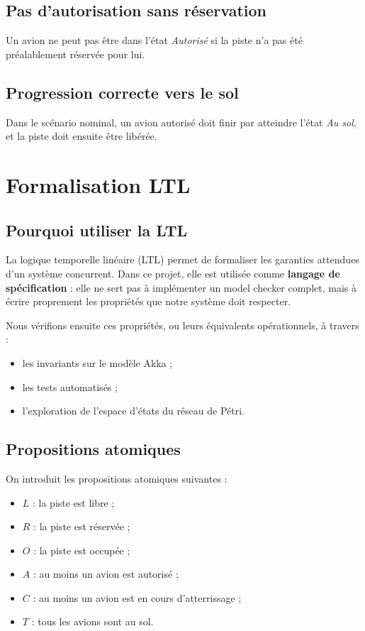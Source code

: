 \documentclass[11pt,a4paper]{article}
\begin{document}
\subsection{Pas d'autorisation sans réservation}

Un avion ne peut pas être dans l'état \emph{Autorisé} si la piste n'a pas été préalablement réservée pour lui.

\subsection{Progression correcte vers le sol}

Dans le scénario nominal, un avion autorisé doit finir par atteindre l'état \emph{Au sol}, et la piste doit ensuite être libérée.

\section{Formalisation LTL}

\subsection{Pourquoi utiliser la LTL}

La logique temporelle linéaire (LTL) permet de formaliser les garanties attendues d'un système concurrent. Dans ce projet, elle est utilisée comme \textbf{langage de spécification} : elle ne sert pas à implémenter un model checker complet, mais à écrire proprement les propriétés que notre système doit respecter.

Nous vérifions ensuite ces propriétés, ou leurs équivalents opérationnels, à travers :
\begin{itemize}
    \item les invariants sur le modèle Akka ;
    \item les tests automatisés ;
    \item l'exploration de l'espace d'états du réseau de Pétri.
\end{itemize}

\subsection{Propositions atomiques}

On introduit les propositions atomiques suivantes :
\begin{itemize}
    \item $L$ : la piste est libre ;
    \item $R$ : la piste est réservée ;
    \item $O$ : la piste est occupée ;
    \item $A$ : au moins un avion est autorisé ;
    \item $C$ : au moins un avion est en cours d'atterrissage ;
    \item $T$ : tous les avions sont au sol.
\end{itemize}
\end{document}
